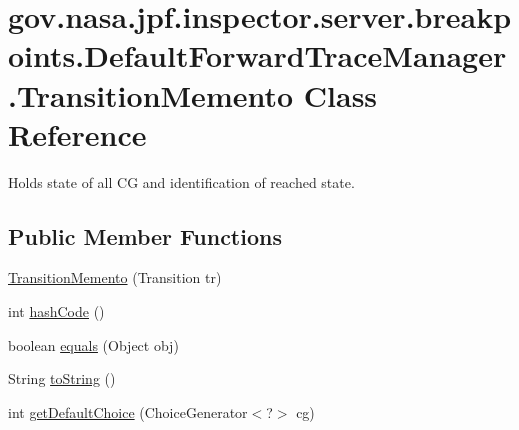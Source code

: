 \hypertarget{classgov_1_1nasa_1_1jpf_1_1inspector_1_1server_1_1breakpoints_1_1_default_forward_trace_manager_1_1_transition_memento}{}\section{gov.\+nasa.\+jpf.\+inspector.\+server.\+breakpoints.\+Default\+Forward\+Trace\+Manager.\+Transition\+Memento Class Reference}
\label{classgov_1_1nasa_1_1jpf_1_1inspector_1_1server_1_1breakpoints_1_1_default_forward_trace_manager_1_1_transition_memento}


Holds state of all CG and identification of reached state.  


\subsection*{Public Member Functions}
\begin{DoxyCompactItemize}
\item 
\hyperlink{classgov_1_1nasa_1_1jpf_1_1inspector_1_1server_1_1breakpoints_1_1_default_forward_trace_manager_1_1_transition_memento_a9d801493004d451106df6bd79960b385}{Transition\+Memento} (Transition tr)
\item 
int \hyperlink{classgov_1_1nasa_1_1jpf_1_1inspector_1_1server_1_1breakpoints_1_1_default_forward_trace_manager_1_1_transition_memento_a238a73c2cc0c742db326be0f2c3621ec}{hash\+Code} ()
\item 
boolean \hyperlink{classgov_1_1nasa_1_1jpf_1_1inspector_1_1server_1_1breakpoints_1_1_default_forward_trace_manager_1_1_transition_memento_afb383b918c2cbcc8d2a511cb37baa896}{equals} (Object obj)
\item 
String \hyperlink{classgov_1_1nasa_1_1jpf_1_1inspector_1_1server_1_1breakpoints_1_1_default_forward_trace_manager_1_1_transition_memento_ae65dea217a45b179ef2fe3e576466cb7}{to\+String} ()
\item 
int \hyperlink{classgov_1_1nasa_1_1jpf_1_1inspector_1_1server_1_1breakpoints_1_1_default_forward_trace_manager_1_1_transition_memento_afaebb2d41c45275aefbacfb7b4586f4c}{get\+Default\+Choice} (Choice\+Generator$<$?$>$ cg)
\end{DoxyCompactItemize}

